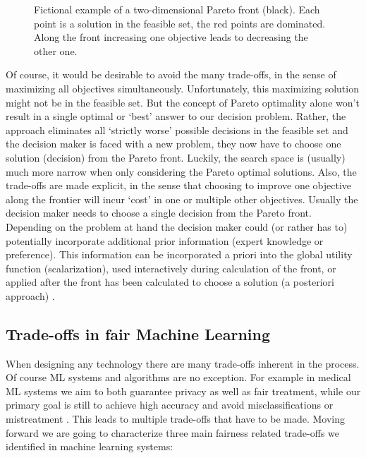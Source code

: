 	\begin{figure}
	\begin{center}
			
	\caption{Fictional example of a two-dimensional Pareto front (black). Each point is a solution in the feasible set, the red points are dominated. Along the front increasing one objective leads to decreasing the other one.}
	\label{fig:pareto}
	\end{center}
	\end{figure}
	
	Of course, it would be desirable to avoid the many trade-offs, in the sense of maximizing all objectives simultaneously.
	Unfortunately, this maximizing solution might not be in the feasible set.
	But the concept of Pareto optimality alone won't result in a single optimal or `best' answer to our decision problem.
	Rather, the approach eliminates all `strictly worse' possible decisions in the feasible set and the decision maker is faced with a new problem, they now have to choose one solution (decision) from the Pareto front.
	Luckily, the search space is (usually) much more narrow when only considering the Pareto optimal solutions.
	Also, the trade-offs are made explicit, in the sense that choosing to improve one objective along the frontier will incur `cost' in one or multiple other objectives.
	Usually the decision maker needs to choose a single decision from the Pareto front.
	Depending on the problem at hand the decision maker could (or rather has to) potentially incorporate additional prior information (expert knowledge or preference).
	This information can be incorporated a priori into the global utility function (scalarization), used interactively during calculation of the front, or applied after the front has been calculated to choose a solution (a posteriori approach) \cite{hwang2012multiple}.


	\subsection{Trade-offs in fair Machine Learning}
	When designing any technology \cite{alexander1964notes} there are many trade-offs inherent in the process.
	Of course ML systems and algorithms are no exception.
	For example in medical ML systems we aim to both guarantee privacy as well as fair treatment, while our primary goal is still to achieve high accuracy and avoid misclassifications or mistreatment \cite{Chester2020}.
	This leads to multiple trade-offs that have to be made.
	Moving forward we are going to characterize three main fairness related trade-offs we identified in machine learning systems:
	
